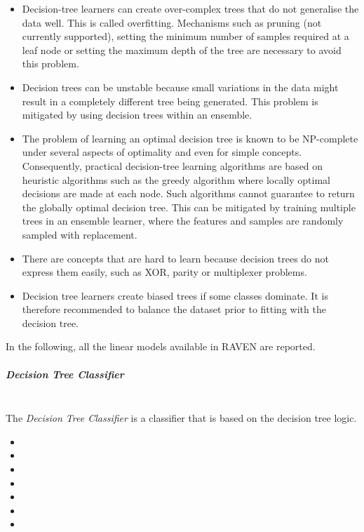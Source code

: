 \begin{itemize}
  \item Decision-tree learners can create over-complex trees that do not
  generalise the data well.
  This is called overfitting.
  Mechanisms such as pruning (not currently supported), setting the minimum
  number of samples required at a leaf node or setting the maximum depth of the
  tree are necessary to avoid this problem.
  \item Decision trees can be unstable because small variations in the data
  might result in a completely different tree being generated.
  This problem is mitigated by using decision trees within an ensemble.
  \item The problem of learning an optimal decision tree is known to be
  NP-complete under several aspects of optimality and even for simple concepts.
  Consequently, practical decision-tree learning algorithms are based on
  heuristic algorithms such as the greedy algorithm where locally optimal
  decisions are made at each node.
  Such algorithms cannot guarantee to return the globally optimal decision tree.
  This can be mitigated by training multiple trees in an ensemble learner, where
  the features and samples are randomly sampled with replacement.
  \item There are concepts that are hard to learn because decision trees do not
  express them easily, such as XOR, parity or multiplexer problems.
  \item Decision tree learners create biased trees if some classes dominate.
  It is therefore recommended to balance the dataset prior to fitting with the
  decision tree.
\end{itemize}

In the following, all the linear models available in RAVEN are reported.

\subparagraph{Decision Tree Classifier}
\mbox{}
\\The \textit{Decision Tree Classifier} is a classifier that is based on the
decision tree logic.

\begin{itemize}
  \item {}
  \item {}
  \item {}
  \item {}
  \item {}
  \item {}
  \item {}
\end{itemize}

